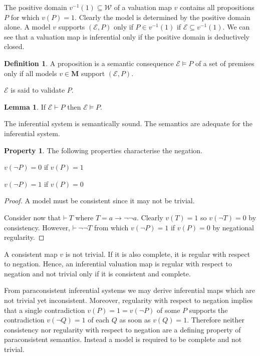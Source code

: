 \documentclass{amsbook}
\newcommand{\wffs}{\mathcal W}
\newcommand{\infers}{\mathrel\vdash}
\newcommand{\theorem}{\mathord\vdash\medspace}
\newcommand{\valids}{\mathrel\vDash}
\newcommand{\then}{\mathrel\rightarrow}
\theoremstyle{definition}
\newtheorem{prop}{Property}[section]
\newtheorem{lmm}{Lemma}[section]
\newtheorem{dfn}{Definition}[section]
\begin{document}
The positive domain $v^{-1}(1) \subseteq \wffs$ of a valuation map $v$ contains all propositions $P$ for which $v(P) = 1$. Clearly the model is determined by the positive domain alone. A model $v$ supports $(\mathcal E, P)$ only if $P \in v^{-1}(1)$ if $\mathcal E \subseteq v^{-1}(1)$. We can see that a valuation map is inferential only if the positive domain is deductively closed.

\begin{dfn}
    A proposition is a semantic consequence $\mathcal E \valids P$ of a set of premises only if all models $v \in \mathbf M$ support $(\mathcal E, P)$.

    $\mathcal E$ is said to validate $P$.
\end{dfn}

\begin{lmm}
    If $\mathcal E \infers P$ then $\mathcal E \valids P$.

    The inferential system is semantically sound. The semantics are adequate for the inferential system.
\end{lmm}

\begin{prop}
    The following properties characterise the negation.
    \begin{description}[
            labelindent=\parindent,
            before={
                    \renewcommand\makelabel[1]{(##1).}
                }
        ]
        \item[consistency] $v(\neg P) = 0$ if $v(P) = 1$
        \item[completeness] $v(\neg P) = 1$ if $v(P) = 0$
    \end{description}

    \begin{proof}
        A model must be consistent since it may not be trivial.

        Consider now that $\theorem T$ where $T = a \then \neg\neg a$. Clearly $v(T) = 1$ so $v(\neg T) = 0$ by consistency. However, $\theorem \neg\neg T$ from which $v(\neg P) = 1$ if $v(P) = 0$ by negational regularity.
    \end{proof}
\end{prop}

A consistent map $v$ is not trivial. If it is also complete, it is regular with respect to negation. Hence, an inferential valuation map is regular with respect to negation and not trivial only if it is consistent and complete.

From paraconsistent inferential systems we may derive inferential maps which are not trivial yet inconsistent. Moreover, regularity with respect to negation implies that a single contradiction $v(P) = 1 = v(\neg P)$ of some $P$ supports the contradiction $v(\neg Q) = 1$ of each $Q$ as soon as $v(Q) = 1$. Therefore neither consistency nor regularity with respect to negation are a defining property of paraconsistent semantics. Instead a model is required to be complete and not trivial.
\end{document}
